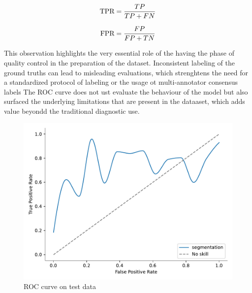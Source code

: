 \begin{equation}
\addcontentsline{equ}{equations}{\protect\numberline{\theequation}True Positive Rate}
    \text{TPR} = \frac{TP}{TP + FN}
\end{equation}
    
\begin{equation}
    \addcontentsline{equ}{equations}{\protect\numberline{\theequation}False Positive Rate}
    \text{FPR} = \frac{FP}{FP + TN}
\end{equation}

This observation highlights the very essential role of the having the phase of quality control in the preparation of the dataset. Inconsistent labeling of the ground truths can lead to misleading evaluations, which strenghtens the need for a standardized protocol of labeling or the usage ot multi-annotator consensus labels The ROC curve does not ust evaluate the behaviour of the model but also surfaced the underlying limitations that are present in the dataaset, which adds value beyondd the traditional diagnostic use.

\begin{figure}[htb!]  %
    \centering
	\centering
	\includegraphics[width=1\textwidth]{images/ROC.pdf}
	\caption{\centering ROC curve on test data}
	\label{Fig:roc}
\end{figure}

